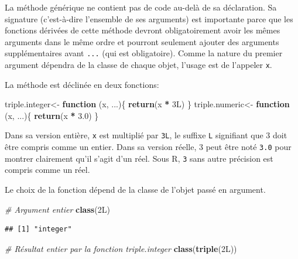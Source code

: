 \documentclass[
  12pt,
  french,
  a4paper,
  extrafontsizes,onecolumn,openright
  ]{memoir}
\newenvironment{Shaded}{\begin{snugshade}}{\end{snugshade}}
\newcommand{\CommentTok}[1]{\textcolor[rgb]{0.56,0.35,0.01}{\textit{#1}}}
\newcommand{\ControlFlowTok}[1]{\textcolor[rgb]{0.13,0.29,0.53}{\textbf{#1}}}
\newcommand{\DataTypeTok}[1]{\textcolor[rgb]{0.13,0.29,0.53}{#1}}
\newcommand{\DecValTok}[1]{\textcolor[rgb]{0.00,0.00,0.81}{#1}}
\newcommand{\FloatTok}[1]{\textcolor[rgb]{0.00,0.00,0.81}{#1}}
\newcommand{\FunctionTok}[1]{\textcolor[rgb]{0.13,0.29,0.53}{\textbf{#1}}}
\newcommand{\NormalTok}[1]{#1}
\newcommand{\OtherTok}[1]{\textcolor[rgb]{0.56,0.35,0.01}{#1}}
\newcommand{\SpecialCharTok}[1]{\textcolor[rgb]{0.81,0.36,0.00}{\textbf{#1}}}
\begin{document}
\normalsize

La méthode générique ne contient pas de code au-delà de sa déclaration.
Sa signature (c'est-à-dire l'ensemble de ses arguments) est importante parce que les fonctions dérivées de cette méthode devront obligatoirement avoir les mêmes arguments dans le même ordre et pourront seulement ajouter des arguments supplémentaires avant \texttt{...} (qui est obligatoire).
Comme la nature du premier argument dépendra de la classe de chaque objet, l'usage est de l'appeler \texttt{x}.

La méthode est déclinée en deux fonctions:

\scriptsize

\begin{Shaded}
\begin{Highlighting}[]
\NormalTok{triple.integer}\OtherTok{\textless{}{-}} \ControlFlowTok{function}\NormalTok{ (x, ...)\{}
  \FunctionTok{return}\NormalTok{(x }\SpecialCharTok{*} \DecValTok{3}\DataTypeTok{L}\NormalTok{)}
\NormalTok{\}}
\NormalTok{triple.numeric}\OtherTok{\textless{}{-}} \ControlFlowTok{function}\NormalTok{ (x, ...)\{}
  \FunctionTok{return}\NormalTok{(x }\SpecialCharTok{*} \FloatTok{3.0}\NormalTok{)}
\NormalTok{\}}
\end{Highlighting}
\end{Shaded}

\normalsize

Dans sa version entière, \texttt{x} est multiplié par \texttt{3L}, le suffixe \texttt{L} signifiant que 3 doit être compris comme un entier.
Dans sa version réelle, 3 peut être noté \texttt{3.0} pour montrer clairement qu'il s'agit d'un réel.
Sous R, \texttt{3} sans autre précision est compris comme un réel.

Le choix de la fonction dépend de la classe de l'objet passé en argument.

\scriptsize

\begin{Shaded}
\begin{Highlighting}[]
\CommentTok{\# Argument entier}
\FunctionTok{class}\NormalTok{(}\DecValTok{2}\DataTypeTok{L}\NormalTok{)}
\end{Highlighting}
\end{Shaded}

\begin{verbatim}
## [1] "integer"
\end{verbatim}

\begin{Shaded}
\begin{Highlighting}[]
\CommentTok{\# Résultat entier par la fonction triple.integer}
\FunctionTok{class}\NormalTok{(}\FunctionTok{triple}\NormalTok{(}\DecValTok{2}\DataTypeTok{L}\NormalTok{))}
\end{Highlighting}
\end{Shaded}
\end{document}
